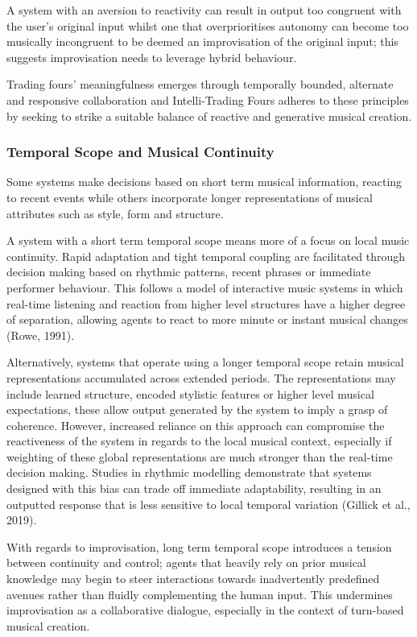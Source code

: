 \documentclass[11pt,a4paper]{article}
\begin{document}
A system with an aversion to reactivity can result in output too congruent with the user’s original input whilst one that overprioritises autonomy can become too musically incongruent to be deemed an improvisation of the original input; this suggests improvisation needs to leverage hybrid behaviour. 

Trading fours’ meaningfulness emerges through temporally bounded, alternate and responsive collaboration and Intelli-Trading Fours adheres to these principles by seeking to strike a suitable balance of reactive and generative musical creation.

\subsubsection{Temporal Scope and Musical Continuity}
Some systems make decisions based on short term musical information, reacting to recent events while others incorporate longer representations of musical attributes such as style, form and structure. 

A system with a short term temporal scope means more of a focus on local music continuity. Rapid adaptation and tight temporal coupling are facilitated through decision making based on rhythmic patterns, recent phrases or immediate performer behaviour. This follows a model of interactive music systems in which real-time listening and reaction from higher level structures have a higher degree of separation, allowing agents to react to more minute or instant musical changes (Rowe, 1991). 

Alternatively, systems that operate using a longer temporal scope retain musical representations accumulated across extended periods. The representations may include learned structure, encoded stylistic features or higher level musical expectations, these allow output generated by the system to imply a grasp of coherence. However, increased reliance on this approach can compromise the reactiveness of the system in regards to the local musical context, especially if weighting of these global representations are much stronger than the real-time decision making. Studies in rhythmic modelling demonstrate that systems designed with this bias can trade off immediate adaptability, resulting in an outputted response that is less sensitive to local temporal variation (Gillick et al., 2019). 

With regards to improvisation, long term temporal scope introduces a tension between continuity and control; agents that heavily rely on prior musical knowledge may begin to steer interactions towards inadvertently predefined avenues rather than fluidly complementing the human input. This undermines improvisation as a collaborative dialogue, especially in the context of turn-based musical creation. 
\end{document}
